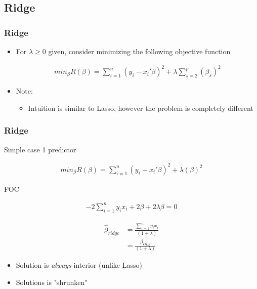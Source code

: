 \documentclass[
  shownotes,
  xcolor={svgnames},
  hyperref={colorlinks,citecolor=DarkBlue,linkcolor=DarkRed,urlcolor=DarkBlue}
  , aspectratio=169]{beamer}
\begin{document}
\subsection{Ridge}
\begin{frame}[fragile]
\frametitle{Ridge}

\begin{itemize}
\item For $\lambda \geq 0$ given, consider minimizing the following objective function


\begin{align}
min_{\beta} R(\beta) = \sum_{i=1}^n (y_i-x_i'\beta)^2 + \lambda \sum_{s=2}^p (\beta_s)^2
\end{align}

\bigskip
\item Note:
\begin{itemize}
  \item Intuition is similar to Lasso, however the problem is completely different
\end{itemize}
\end{itemize}


\end{frame}
\begin{frame}[fragile]
\frametitle{Ridge}

Simple case 1 predictor

\begin{align}
min_{\beta} R(\beta) = \sum_{i=1}^n (y_i-x_i'\beta)^2 + \lambda  (\beta)^2
\end{align}

FOC

\begin{align}
-2 \sum_{i=1}^n  y_i x_i + 2\beta + 2 \lambda  \beta =0
\end{align}

\begin{align}
\hat{\beta}_{ridge} &= \frac{\sum_{i=1}^n  y_i x_i}{(1+ \lambda)} \nonumber \\
                    &= \frac{\beta_{OLS}}{(1+ \lambda)}
\end{align}

\begin{itemize}
\item Solution is {\it always} interior (unlike Lasso)
\item Solutions is "shrunken"
\end{itemize}
\end{frame}
\end{document}
